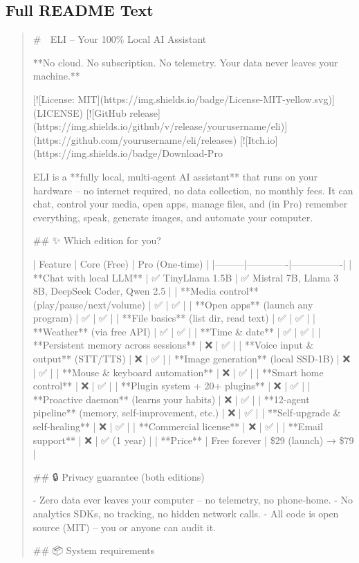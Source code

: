 \documentclass[11pt,a4paper]{article}
\begin{document}
\subsection*{Full README Text}
\begin{quote}
\ttfamily
\# 🧠 ELI – Your 100\% Local AI Assistant

**No cloud. No subscription. No telemetry. Your data never leaves your machine.**

[![License: MIT](https://img.shields.io/badge/License-MIT-yellow.svg)](LICENSE)
[![GitHub release](https://img.shields.io/github/v/release/yourusername/eli)](https://github.com/yourusername/eli/releases)
[![Itch.io](https://img.shields.io/badge/Download-Pro%

ELI is a **fully local, multi‑agent AI assistant** that runs on your hardware – no internet required, no data collection, no monthly fees.  
It can chat, control your media, open apps, manage files, and (in Pro) remember everything, speak, generate images, and automate your computer.

\#\# ✨ Which edition for you?

| Feature | Core (Free) | Pro (One‑time) |
|---------|-------------|----------------|
| **Chat with local LLM** | ✅ TinyLlama 1.5B | ✅ Mistral 7B, Llama 3 8B, DeepSeek Coder, Qwen 2.5 |
| **Media control** (play/pause/next/volume) | ✅ | ✅ |
| **Open apps** (launch any program) | ✅ | ✅ |
| **File basics** (list dir, read text) | ✅ | ✅ |
| **Weather** (via free API) | ✅ | ✅ |
| **Time \& date** | ✅ | ✅ |
| **Persistent memory across sessions** | ❌ | ✅ |
| **Voice input \& output** (STT/TTS) | ❌ | ✅ |
| **Image generation** (local SSD‑1B) | ❌ | ✅ |
| **Mouse \& keyboard automation** | ❌ | ✅ |
| **Smart home control** | ❌ | ✅ |
| **Plugin system + 20+ plugins** | ❌ | ✅ |
| **Proactive daemon** (learns your habits) | ❌ | ✅ |
| **12‑agent pipeline** (memory, self‑improvement, etc.) | ❌ | ✅ |
| **Self‑upgrade \& self‑healing** | ❌ | ✅ |
| **Commercial license** | ❌ | ✅ |
| **Email support** | ❌ | ✅ (1 year) |
| **Price** | Free forever | \$29 (launch) → \$79 |

\#\# 🔒 Privacy guarantee (both editions)

- Zero data ever leaves your computer – no telemetry, no phone‑home.
- No analytics SDKs, no tracking, no hidden network calls.
- All code is open source (MIT) – you or anyone can audit it.

\#\# 📦 System requirements


\end{quote}
\end{document}
